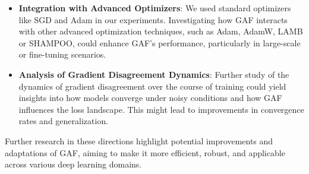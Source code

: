 \begin{itemize}
    \item \textbf{Integration with Advanced Optimizers}: We used standard optimizers like SGD and Adam in our experiments. Investigating how GAF interacts with other advanced optimization techniques, such as Adam, AdamW, LAMB or SHAMPOO, could enhance GAF’s performance, particularly in large-scale or fine-tuning scenarios.

    \item \textbf{Analysis of Gradient Disagreement Dynamics}: Further study of the dynamics of gradient disagreement over the course of training could yield insights into how models converge under noisy conditions and how GAF influences the loss landscape. This might lead to improvements in convergence rates and generalization.

\end{itemize}

Further research in these directions highlight potential improvements and adaptations of GAF, aiming to make it more efficient, robust, and applicable across various deep learning domains. %

